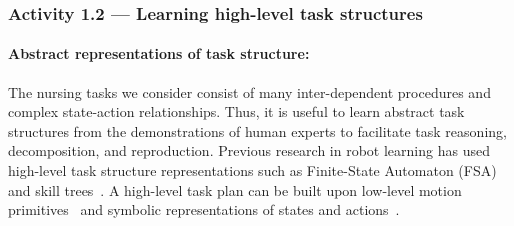\documentclass[letterpaper, 11 pt, onecolumn]{article}
\newcommand{\zhi}[1]{\textcolor{blue}{ZL: #1}}
\newcommand{\jie}[1]{\textcolor{green}{JF: #1}}
\begin{document}










\subsubsection{Activity 1.2 --- Learning high-level task structures}\label{sec:plan-motion-high}

\paragraph*{Abstract representations of task structure:} The nursing tasks we consider consist of many inter-dependent procedures and complex state-action relationships. Thus, it is useful to learn abstract task structures from the demonstrations of human experts to facilitate task reasoning, decomposition, and reproduction. Previous research in robot learning has used high-level task structure representations such as Finite-State Automaton (FSA)~\cite{niekum2013semantically} and skill trees~\cite{konidaris2012robot}. A high-level task plan can be built upon low-level motion primitives~\cite{konidaris2012robot} and symbolic representations of states and actions~\cite{konidaris2018skills}. 
\end{document}
